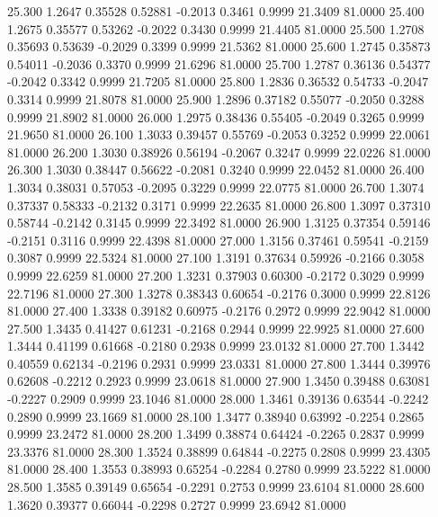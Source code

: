   25.300   1.2647   0.35528   0.52881  -0.2013   0.3461   0.9999  21.3409  81.0000
  25.400   1.2675   0.35577   0.53262  -0.2022   0.3430   0.9999  21.4405  81.0000
  25.500   1.2708   0.35693   0.53639  -0.2029   0.3399   0.9999  21.5362  81.0000
  25.600   1.2745   0.35873   0.54011  -0.2036   0.3370   0.9999  21.6296  81.0000
  25.700   1.2787   0.36136   0.54377  -0.2042   0.3342   0.9999  21.7205  81.0000
  25.800   1.2836   0.36532   0.54733  -0.2047   0.3314   0.9999  21.8078  81.0000
  25.900   1.2896   0.37182   0.55077  -0.2050   0.3288   0.9999  21.8902  81.0000
  26.000   1.2975   0.38436   0.55405  -0.2049   0.3265   0.9999  21.9650  81.0000
  26.100   1.3033   0.39457   0.55769  -0.2053   0.3252   0.9999  22.0061  81.0000
  26.200   1.3030   0.38926   0.56194  -0.2067   0.3247   0.9999  22.0226  81.0000
  26.300   1.3030   0.38447   0.56622  -0.2081   0.3240   0.9999  22.0452  81.0000
  26.400   1.3034   0.38031   0.57053  -0.2095   0.3229   0.9999  22.0775  81.0000
  26.700   1.3074   0.37337   0.58333  -0.2132   0.3171   0.9999  22.2635  81.0000
  26.800   1.3097   0.37310   0.58744  -0.2142   0.3145   0.9999  22.3492  81.0000
  26.900   1.3125   0.37354   0.59146  -0.2151   0.3116   0.9999  22.4398  81.0000
  27.000   1.3156   0.37461   0.59541  -0.2159   0.3087   0.9999  22.5324  81.0000
  27.100   1.3191   0.37634   0.59926  -0.2166   0.3058   0.9999  22.6259  81.0000
  27.200   1.3231   0.37903   0.60300  -0.2172   0.3029   0.9999  22.7196  81.0000
  27.300   1.3278   0.38343   0.60654  -0.2176   0.3000   0.9999  22.8126  81.0000
  27.400   1.3338   0.39182   0.60975  -0.2176   0.2972   0.9999  22.9042  81.0000
  27.500   1.3435   0.41427   0.61231  -0.2168   0.2944   0.9999  22.9925  81.0000
  27.600   1.3444   0.41199   0.61668  -0.2180   0.2938   0.9999  23.0132  81.0000
  27.700   1.3442   0.40559   0.62134  -0.2196   0.2931   0.9999  23.0331  81.0000
  27.800   1.3444   0.39976   0.62608  -0.2212   0.2923   0.9999  23.0618  81.0000
  27.900   1.3450   0.39488   0.63081  -0.2227   0.2909   0.9999  23.1046  81.0000
  28.000   1.3461   0.39136   0.63544  -0.2242   0.2890   0.9999  23.1669  81.0000
  28.100   1.3477   0.38940   0.63992  -0.2254   0.2865   0.9999  23.2472  81.0000
  28.200   1.3499   0.38874   0.64424  -0.2265   0.2837   0.9999  23.3376  81.0000
  28.300   1.3524   0.38899   0.64844  -0.2275   0.2808   0.9999  23.4305  81.0000
  28.400   1.3553   0.38993   0.65254  -0.2284   0.2780   0.9999  23.5222  81.0000
  28.500   1.3585   0.39149   0.65654  -0.2291   0.2753   0.9999  23.6104  81.0000
  28.600   1.3620   0.39377   0.66044  -0.2298   0.2727   0.9999  23.6942  81.0000
